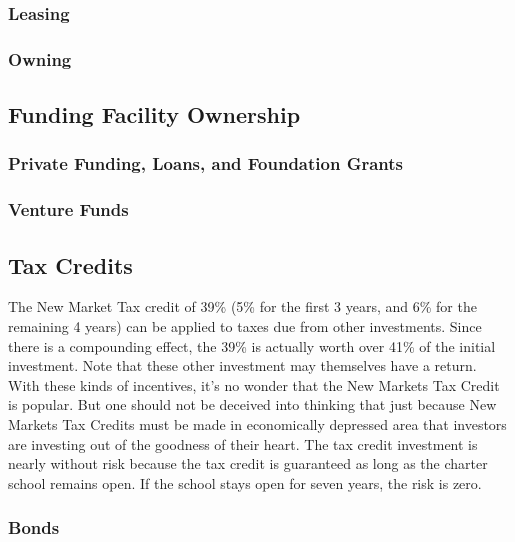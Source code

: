 \subsubsection{Leasing}\label{sec:findings-leasing}\indent

\subsubsection{Owning}\label{sec:findings-owning}\indent

\subsection{Funding Facility Ownership}\label{sec:findings-funding-ownership}\indent

\subsubsection{Private Funding, Loans, and Foundation Grants}\label{sec:findings-private-funding}\indent

\subsubsection{Venture Funds}\label{sec:findings-venture-funds}\indent

\subsection{Tax Credits}\label{sec:tax-credit}\indent

The New Market Tax credit of 39\% (5\% for the first 3 years, and 6\% for the remaining 4 years) can be applied to taxes due from other investments. Since there is a compounding effect, the 39\% is actually worth over 41\% of the initial investment. Note that these other investment may themselves have a return. With these kinds of incentives, it's no wonder that the New Markets Tax Credit is popular. But one should not be deceived into thinking that just because New Markets Tax Credits must be made in economically depressed area that investors are investing out of the goodness of their heart. The tax credit investment is nearly without risk because the tax credit is guaranteed as long as the charter school remains open. If the school stays open for seven years, the risk is zero.

\subsubsection{Bonds}\label{sec:findings-bonds}\indent

